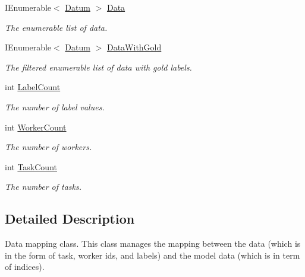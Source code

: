\begin{DoxyCompactItemize}
\item 
I\+Enumerable$<$ \hyperlink{class_crowdsourcing_models_1_1_datum}{Datum} $>$ \hyperlink{class_crowdsourcing_models_1_1_data_mapping_a94564530928ba781bdcf79c2aa2fa242}{Data}
\begin{DoxyCompactList}\small\item\em The enumerable list of data. \end{DoxyCompactList}\item 
I\+Enumerable$<$ \hyperlink{class_crowdsourcing_models_1_1_datum}{Datum} $>$ \hyperlink{class_crowdsourcing_models_1_1_data_mapping_a4baf480d5c8dcce5ecbf8ebeb9a55901}{Data\+With\+Gold}
\begin{DoxyCompactList}\small\item\em The filtered enumerable list of data with gold labels. \end{DoxyCompactList}\item 
int \hyperlink{class_crowdsourcing_models_1_1_data_mapping_aecfecfc671fd79ea8ff2c1b7cb9c9846}{Label\+Count}
\begin{DoxyCompactList}\small\item\em The number of label values. \end{DoxyCompactList}\item 
int \hyperlink{class_crowdsourcing_models_1_1_data_mapping_a9e7c646eda7ddcc56b2c8e9f582299cd}{Worker\+Count}
\begin{DoxyCompactList}\small\item\em The number of workers. \end{DoxyCompactList}\item 
int \hyperlink{class_crowdsourcing_models_1_1_data_mapping_aa548c66dcf33e58829a676081b84c974}{Task\+Count}
\begin{DoxyCompactList}\small\item\em The number of tasks. \end{DoxyCompactList}\end{DoxyCompactItemize}


\subsection{Detailed Description}
Data mapping class. This class manages the mapping between the data (which is in the form of task, worker ids, and labels) and the model data (which is in term of indices). 



